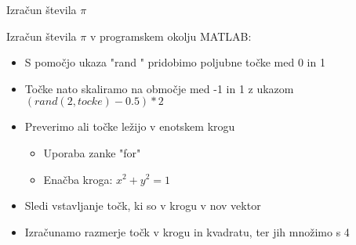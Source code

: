 \begin{frame}{Izračun števila $\pi$}

Izračun števila $\pi$ v programskem okolju MATLAB:

    \begin{itemize}[<+->]
        \item S pomočjo ukaza "rand " pridobimo poljubne točke med 0 in 1
        \item Točke nato skaliramo na območje med -1 in 1 z ukazom $(rand(2,tocke)-0.5)*2$
        \item Preverimo ali točke ležijo v enotskem krogu
        \begin{itemize}[<.->]
            \item Uporaba zanke "for"
            \item Enačba kroga: $x^2+y^2=1$
        \end{itemize}
        \item Sledi vstavljanje točk, ki so v krogu v nov vektor
        \item Izračunamo razmerje točk v krogu in kvadratu, ter jih množimo s 4
         
    \end{itemize}
\end{frame}